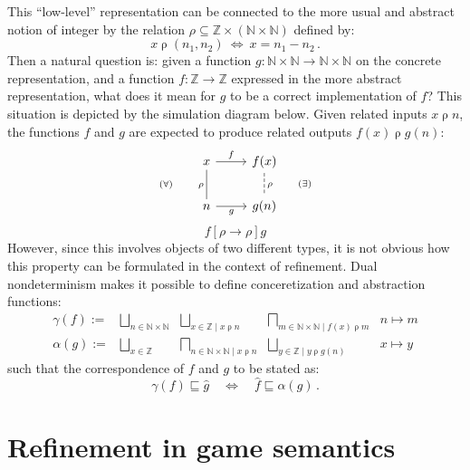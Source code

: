 \documentclass[draft,11pt]{report}
\theoremstyle{definition}
\newcommand{\ifr}[1]{\mathrel{[{#1}]}}
\newcommand{\refby}{\sqsubseteq} %
\begin{document}
This ``low-level'' representation can be connected
to the more usual and abstract notion of integer
by the relation
$\rho \subseteq \mathbb{Z} \times (\mathbb{N} \times \mathbb{N})$
defined by:
\[
  x \mathrel{\rho} (n_1, n_2)
  \: \Leftrightarrow \:
  x = n_1 - n_2
  \,.
\]
Then a natural question is:
given a function
$g : \mathbb{N} \times \mathbb{N} \rightarrow
     \mathbb{N} \times \mathbb{N}$
on the concrete representation,
and a function
$f : \mathbb{Z} \rightarrow \mathbb{Z}$
expressed in the more abstract representation,
what does it mean for $g$ to be a correct implementation of $f$?
This situation is depicted by the simulation diagram below.
Given related inputs $x \mathrel{\rho} n$,
the functions $f$ and $g$ are expected to produce
related outputs $f(x) \mathrel{\rho} g(n)$:
\[
  \begin{tikzcd}
    x \ar[r, "f"] \ar[d, "(\forall) \qquad \rho"', dash] &
    f(x) \ar[d, "\rho \qquad (\exists)", dash, dashed] \\
    n \ar[r, "g"'] &
    g(n)
  \end{tikzcd}
\]
\[
  f \ifr{\rho \rightarrow \rho} g
\]
However,
since this involves objects of two different types,
it is not obvious how this property can be formulated
in the context of refinement.
Dual nondeterminism makes it possible to define
conceretization and abstraction functions:
\[
  \begin{array}{rcccc}
    \gamma(f) := &
      \displaystyle
      \bigsqcup_{\mbox{$n \in \mathbb{N} \times \mathbb{N}$}} &
      \displaystyle
      \bigsqcup_{\mbox{$x \in \mathbb{Z} \mid x \mathrel{\rho} n$}} &
      \displaystyle
      \bigsqcap_{\mbox{$m \in \mathbb{N} \times \mathbb{N} \mid
                 f(x) \mathrel{\rho} m$}} &
      n \mapsto m \\
    \alpha(g) := &
      \displaystyle
      \bigsqcup_{\mbox{$x \in \mathbb{Z}$}} &
      \displaystyle
      \bigsqcap_{\mbox{$n \in \mathbb{N} \times \mathbb{N} \mid
        x \mathrel{\rho} n$}} &
      \displaystyle
      \bigsqcup_{\mbox{$y \in \mathbb{Z} \mid
        y \mathrel{\rho} g(n)$}} &
      x \mapsto y
  \end{array}
\]
such that the correspondence of $f$ and $g$ to be stated as:
\[
  \gamma(f) \sqsubseteq \hat{g}
  \quad \Leftrightarrow \quad
  \hat{f} \refby \alpha(g)
  \,.
\]



\section{Refinement in game semantics} %
\end{document}
